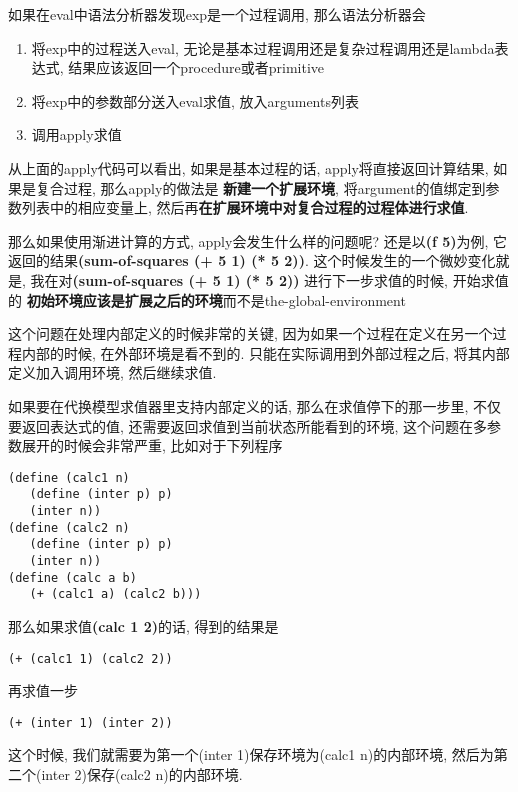 \documentclass{article}
\begin{document}
\begin{CJK*}{UTF8}{gkai}
如果在eval中语法分析器发现exp是一个过程调用, 那么语法分析器会
\begin{enumerate}
    \item 将exp中的过程送入eval, 无论是基本过程调用还是复杂过程调用还是lambda表达式, 结果应该返回一个procedure或者primitive
    \item 将exp中的参数部分送入eval求值, 放入arguments列表
    \item 调用apply求值
\end{enumerate}

从上面的apply代码可以看出, 如果是基本过程的话, apply将直接返回计算结果, 如果是复合过程, 那么apply的做法是\textbf{\color{red} 新建一个扩展环境}, 将argument的值绑定到参数列表中的相应变量上, 然后再\textbf{\color{red}在扩展环境中对复合过程的过程体进行求值}.

那么如果使用渐进计算的方式, apply会发生什么样的问题呢? 还是以{\bfseries \ttfamily (f 5)}为例, 它返回的结果{\bfseries \ttfamily (sum-of-squares (+ 5 1) (* 5 2))}. 这个时候发生的一个微妙变化就是, 我在对{\bfseries \ttfamily (sum-of-squares (+ 5 1) (* 5 2))} 进行下一步求值的时候, 开始求值的\textbf{\color{red} 初始环境应该是扩展之后的环境}而不是the-global-environment

这个问题在处理内部定义的时候非常的关键, 因为如果一个过程在定义在另一个过程内部的时候, 在外部环境是看不到的. 只能在实际调用到外部过程之后, 将其内部定义加入调用环境, 然后继续求值.

如果要在代换模型求值器里支持内部定义的话, 那么在求值停下的那一步里, 不仅要返回表达式的值, 还需要返回求值到当前状态所能看到的环境, 这个问题在多参数展开的时候会非常严重, 比如对于下列程序

\begin{lstlisting}
(define (calc1 n)
   (define (inter p) p)
   (inter n))
(define (calc2 n)
   (define (inter p) p)
   (inter n))
(define (calc a b)
   (+ (calc1 a) (calc2 b)))
\end{lstlisting}

那么如果求值{\ttfamily \bfseries (calc 1 2)}的话, 得到的结果是

\begin{lstlisting}[numbers=none]
(+ (calc1 1) (calc2 2))
\end{lstlisting}

再求值一步

\begin{lstlisting}[numbers=none]
(+ (inter 1) (inter 2))
\end{lstlisting}

这个时候, 我们就需要为第一个(inter 1)保存环境为(calc1 n)的内部环境, 然后为第二个(inter 2)保存(calc2 n)的内部环境.


\end{CJK*}
\end{document}
